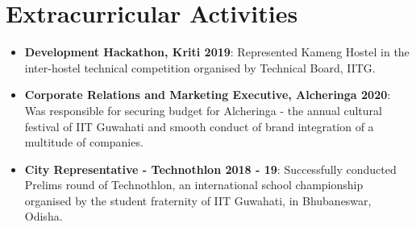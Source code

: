 \documentclass[a4paper,10pt]{report}
\newcommand{\resumeItem}[2]{
  \item\small{
    \textbf{#1}{: #2 \vspace{-2pt}}
  }
}
\newcommand{\resumeSubItem}[2]{\resumeItem{#1}{#2}\vspace{-4pt}}
\newcommand{\resumeSubHeadingListStart}{\begin{itemize}[leftmargin=*]}
\newcommand{\resumeSubHeadingListEnd}{\end{itemize}}
\begin{document}
\vspace{-1pt}
\section{Extracurricular Activities}
\resumeSubHeadingListStart
\resumeSubItem{Development Hackathon, Kriti 2019}{Represented Kameng Hostel in the inter-hostel technical competition organised by Technical Board, IITG.}
\vspace{2pt}
\resumeSubItem{Corporate Relations and Marketing Executive, Alcheringa 2020}{Was responsible for securing budget for Alcheringa - the annual cultural festival of IIT Guwahati and smooth conduct of brand integration of a multitude of companies.}
\vspace{2pt}
\resumeSubItem{City Representative - Technothlon 2018 - 19}{Successfully conducted Prelims round of Technothlon, an international school championship organised by the student fraternity of IIT Guwahati, in Bhubaneswar, Odisha.}
\resumeSubHeadingListEnd
 
 
\end{document}
